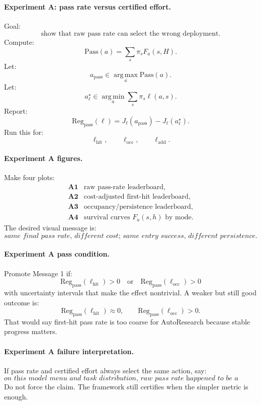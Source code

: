 \documentclass{article}
\providecommand{\argmin}{\operatorname*{arg\,min}}
\providecommand{\argmax}{\operatorname*{arg\,max}}
\begin{document}
\paragraph{Experiment A: pass rate versus certified effort.}
Goal:
\[
    \text{show that raw pass rate can select the wrong deployment.}
\]
Compute:
\[
    \mathrm{Pass}(a)
    =
    \sum_s\pi_sF_a(s,H).
\]
Let:
\[
    a_{\mathrm{pass}}
    \in
    \argmax_a \mathrm{Pass}(a).
\]
Let:
\[
    a_{\ell}^{\star}
    \in
    \argmin_a \sum_s\pi_s\ell(a,s).
\]
Report:
\[
    \mathrm{Reg}_{\mathrm{pass}}(\ell)
    =
    J_\ell(a_{\mathrm{pass}})-J_\ell(a_\ell^\star).
\]
Run this for:
\[
    \ell_{\mathrm{hit}},
    \qquad
    \ell_{\mathrm{occ}},
    \qquad
    \ell_{\mathrm{add}}.
\]

\paragraph{Experiment A figures.}
Make four plots:
\[
\begin{array}{ll}
    \textbf{A1} & \text{raw pass-rate leaderboard},\\
    \textbf{A2} & \text{cost-adjusted first-hit leaderboard},\\
    \textbf{A3} & \text{occupancy/persistence leaderboard},\\
    \textbf{A4} & \text{survival curves \(F_a(s,h)\) by mode}.
\end{array}
\]
The desired visual message is:
\[
    \textit{same final pass rate, different cost; same entry success, different persistence.}
\]

\paragraph{Experiment A pass condition.}
Promote Message 1 if:
\[
    \mathrm{Reg}_{\mathrm{pass}}(\ell_{\mathrm{hit}})>0
    \quad\text{or}\quad
    \mathrm{Reg}_{\mathrm{pass}}(\ell_{\mathrm{occ}})>0
\]
with uncertainty intervals that make the effect nontrivial.
A weaker but still good outcome is:
\[
    \mathrm{Reg}_{\mathrm{pass}}(\ell_{\mathrm{hit}})\approx 0,
    \qquad
    \mathrm{Reg}_{\mathrm{pass}}(\ell_{\mathrm{occ}})>0.
\]
That would say first-hit pass rate is too coarse for AutoResearch because stable progress matters.

\paragraph{Experiment A failure interpretation.}
If pass rate and certified effort always select the same action, say:
\[
    \textit{on this model menu and task distribution, raw pass rate happened to be
    a sufficient proxy.}
\]
Do not force the claim.
The framework still certifies when the simpler metric is enough.
\end{document}
